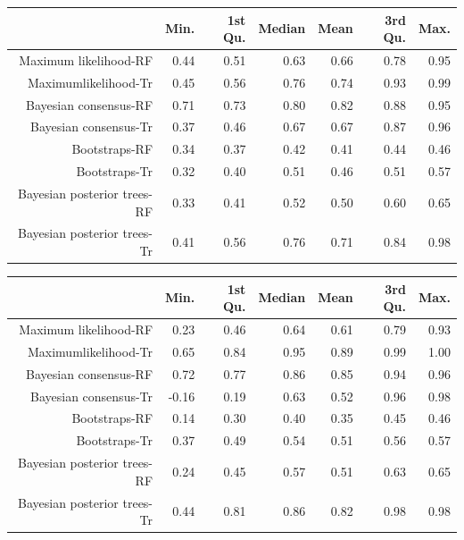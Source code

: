 \begin{table}[ht]
\centering
\begin{tabular}{rrrrrrr}
  \hline
 & Min. & 1st Qu. & Median & Mean & 3rd Qu. & Max. \\ 
  \hline
Maximum likelihood-RF & 0.44 & 0.51 & 0.63 & 0.66 & 0.78 & 0.95 \\ 
  Maximumlikelihood-Tr & 0.45 & 0.56 & 0.76 & 0.74 & 0.93 & 0.99 \\ 
  Bayesian consensus-RF & 0.71 & 0.73 & 0.80 & 0.82 & 0.88 & 0.95 \\ 
  Bayesian consensus-Tr & 0.37 & 0.46 & 0.67 & 0.67 & 0.87 & 0.96 \\ 
  Bootstraps-RF & 0.34 & 0.37 & 0.42 & 0.41 & 0.44 & 0.46 \\ 
  Bootstraps-Tr & 0.32 & 0.40 & 0.51 & 0.46 & 0.51 & 0.57 \\ 
  Bayesian posterior trees-RF & 0.33 & 0.41 & 0.52 & 0.50 & 0.60 & 0.65 \\ 
  Bayesian posterior trees-Tr & 0.41 & 0.56 & 0.76 & 0.71 & 0.84 & 0.98 \\ 
   \hline
\end{tabular}
\end{table}

\begin{table}[ht]
\centering
\begin{tabular}{rrrrrrr}
  \hline
 & Min. & 1st Qu. & Median & Mean & 3rd Qu. & Max. \\ 
  \hline
Maximum likelihood-RF & 0.23 & 0.46 & 0.64 & 0.61 & 0.79 & 0.93 \\ 
  Maximumlikelihood-Tr & 0.65 & 0.84 & 0.95 & 0.89 & 0.99 & 1.00 \\ 
  Bayesian consensus-RF & 0.72 & 0.77 & 0.86 & 0.85 & 0.94 & 0.96 \\ 
  Bayesian consensus-Tr & -0.16 & 0.19 & 0.63 & 0.52 & 0.96 & 0.98 \\ 
  Bootstraps-RF & 0.14 & 0.30 & 0.40 & 0.35 & 0.45 & 0.46 \\ 
  Bootstraps-Tr & 0.37 & 0.49 & 0.54 & 0.51 & 0.56 & 0.57 \\ 
  Bayesian posterior trees-RF & 0.24 & 0.45 & 0.57 & 0.51 & 0.63 & 0.65 \\ 
  Bayesian posterior trees-Tr & 0.44 & 0.81 & 0.86 & 0.82 & 0.98 & 0.98 \\ 
   \hline
\end{tabular}
\end{table}

